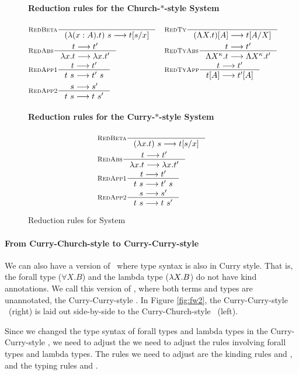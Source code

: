 \begin{figure}
\paragraph{Reduction rules for the Church-$*$-style System \Fw}
\begin{align*}
& \inference[\sc RedBeta]{}{(\l(x:A).t)~s --> t[s/x]}
&&\inference[\sc RedTy]{}{(\L X   .t)[A] --> t[A/X]} \\
& \inference[\sc RedAbs]{t --> t'}{\l x   .t --> \l x   .t'}
&&\inference[\sc RedTyAbs]{t --> t'}{\L X^\kappa   .t --> \L X^\kappa   .t'} \\
& \inference[\sc RedApp1]{t --> t'}{t~s --> t'~s}
&&\inference[\sc RedTyApp]{t --> t'}{t[A] --> t'[A]} \\
& \inference[\sc RedApp2]{s --> s'}{t~s --> t~s'}
\end{align*}
\paragraph{Reduction rules for the Curry-$*$-style System \Fw}
\begin{align*}
& \inference[\sc RedBeta]{}{(\l x   .t)~s --> t[s/x]} \\
& \inference[\sc RedAbs]{t --> t'}{\l x   .t --> \l x   .t'} \\
& \inference[\sc RedApp1]{t --> t'}{t~s --> t'~s} \\
& \inference[\sc RedApp2]{s --> s'}{t~s --> t~s'}
\end{align*}
\caption{Reduction rules for System \Fw}
\label{fig:redfw}
\end{figure}

\paragraph{From Curry-Church-style to Curry-Curry-style}
We can also have a version of \Fw\ where type syntax is also in Curry style.
That is, the forall type ($\forall X.B$) and the lambda type ($\lambda X.B$)
do not have kind annotations. We call this version of \Fw, where both terms
and types are unannotated, the Curry-Curry-style \Fw.
In Figure \ref{fig:fw2}, the Curry-Curry-style \Fw\ (right) is laid out
side-by-side to the Curry-Church-style \Fw\ (left).

Since we changed the type syntax of forall types and lambda types in
the Curry-Curry-style \Fw, we need to adjust the we need to adjust the rules
involving forall types and lambda types. The rules we need to adjust are
the kinding rules  and , and
the typing rules  and .


